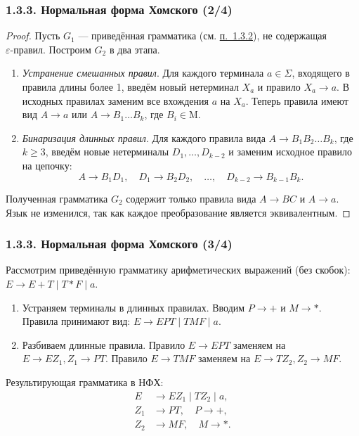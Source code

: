 \documentclass[mathserif,12pt,aspectratio=169]{beamer}
\renewcommand{\index}[1]{}
\def\odmkey#1#2{{\it\color{red} #1}\index{#2}}
\let\ge\geqslant
\def\DMref#1#2{{\color{blue}\underline{\hyperlink{#2}{#1}}}}
\begin{document}
\begin{frame}
\frametitle{1.3.3. Нормальная форма Хомского (2/4)}

\begin{proof}
Пусть $G_1$ — приведённая грамматика (см. \DMref{п.~1.3.2}{1.3.2.}), не содержащая \\$\varepsilon$-правил.
Построим $G_2$ в два этапа.
\begin{enumerate}
    \item \odmkey{Устранение смешанных правил}{Устранение!смешанных правил}. 
    Для каждого терминала $a\in \Sigma$, входящего в правила длины более 1, введём новый нетерминал $X_a$ и правило $X_a \to a$.
    В исходных правилах заменим все вхождения $a$ на $X_a$.
    Теперь правила имеют вид $A \to a$ или $A \to B_1 \dots B_k$, где $B_i \in \mathrm{M}$.
    \item \odmkey{Бинаризация длинных правил}{Бинаризация!правил}.
    Для каждого правила вида $A \to B_1 B_2 \dots B_k$, где $k \ge 3$, введём новые нетерминалы $D_1, \dots, D_{k-2}$ и заменим исходное правило на цепочку:
    $$
    A \to B_1 D_1, \quad D_1 \to B_2 D_2, \quad \dots, \quad D_{k-2} \to B_{k-1} B_k.
    $$
\end{enumerate}
Полученная грамматика $G_2$ содержит только правила вида $A \to BC$ и $A \to a$.
Язык не изменился, так как каждое преобразование является эквивалентным.
\end{proof}
\end{frame}
\begin{frame}
\frametitle{1.3.3. Нормальная форма Хомского (3/4)}

\begin{example}
Рассмотрим приведённую грамматику арифметических выражений (без скобок):
$E \to E+T \mid T*F \mid a$.
\begin{enumerate}
    \item Устраняем терминалы в длинных правилах. Вводим $P \to +$ и $M \to *$.
    Правила принимают вид:
    $E \to EPT \mid TMF \mid a$.
    \item Разбиваем длинные правила.
    Правило $E \to EPT$ заменяем на $E \to E Z_1, Z_1 \to PT$.
    Правило $E \to TMF$ заменяем на $E \to T Z_2, Z_2 \to MF$.
\end{enumerate}
Результирующая грамматика в НФХ:
$$
\begin{aligned}
E &\to E Z_1 \mid T Z_2 \mid a, \\
Z_1 &\to P T, \quad P \to +, \\
Z_2 &\to M F, \quad M \to *.
\end{aligned}
$$
\end{example}
\end{frame}
\end{document}
